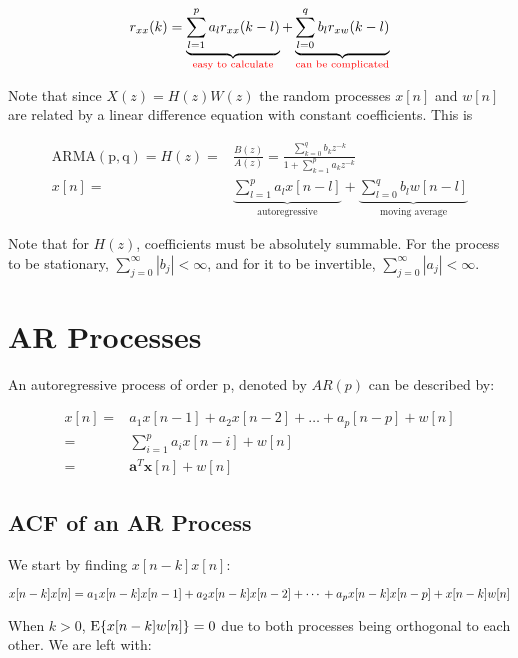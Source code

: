 \begin{equation}
    r_{xx}(k)=\underbrace{\sum_{l=1}^pa_lr_{xx}(k-l)}_{\color{red}{\text{easy to calculate}}}+\underbrace{\sum_{l=0}^qb_lr_{xw}(k-l)}_{\color{red}{\text{can be complicated}}}
\end{equation}

Note that since $X(z) = H(z)W(z)$ the random processes $x[n]$ and $w[n]$ are related by a linear difference equation with constant coefficients. This is 

\begin{equation}
    \begin{aligned}\mathrm{ARMA(p,q)}=H(z)=&\frac{B(z)}{A(z)}=\frac{\sum_{k=0}^qb_kz^{-k}}{1+\sum_{k=1}^pa_kz^{-k}}\\x[n]=&\underbrace{\sum_{l=1}^pa_lx[n-l]}_{\text{autoregressive}}+\underbrace{\sum_{l=0}^qb_lw[n-l]}_{\text{moving average}}\end{aligned}
\end{equation}

Note that for $H(z)$, coefficients must be absolutely summable. For the process to be stationary, $\sum_{j=0}^\infty|b_j|<\infty$, and for it to be invertible, $\sum_{j=0}^\infty|a_j|<\infty$.


\section{AR Processes}
An autoregressive process of order p, denoted by $AR(p)$ can be described by:

\begin{align}
    x[n] =& a_1x[n-1] + a_2x[n-2]+ \ldots + a_p[n-p] + w[n] \\=&\sum_{i=1}^pa_ix[n-i]+w[n]\\
    =&\mathbf{a}^T\mathbf{x}[n]+w[n]
\end{align}

\subsection{ACF of an AR Process}
We start by finding $x[n-k]x[n]$:

\begin{equation}
    x[n-k]x[n]=\\a_1x[n-k]x[n-1]+a_2x[n-k]x[n-2]+\cdots\\+a_px[n-k]x[n-p]+x[n-k]w[n]
\end{equation}

When $k>0$, $\text{E}\{x[n-k]w[n]\} =0$ due to both processes being orthogonal to each other. We are left with:

